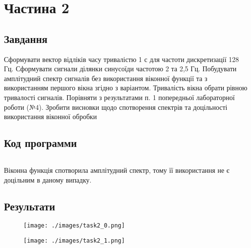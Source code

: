 \section{Частина 2}
\label{sec:task2}

\subsection{Завдання}
\label{subsec:task2_task}

Сформувати вектор відліків часу тривалістю 1 с для частоти
дискретизації 128 Гц. Сформувати сигнали ділянки синусоїди частотою 2 та
2,5 Гц. Побудувати амплітудний спектр сигналів без використання віконної
функції та з використанням першого вікна згідно з варіантом. Тривалість вікна
обрати рівною тривалості сигналів. Порівняти з результатами п. 1 попередньої
лабораторної роботи (№4). Зробити висновки щодо спотворення спектрів та
доцільності використання віконної обробки

\subsection{Код программи}
\label{subsec:task2_code}
\inputminted{python}{../src/task2.py}

Віконна функція спотворила амплітудний спектр,
тому її використання не є доцільним в даному випадку.

\subsection{Результати}
\label{subsec:task2_results}

\begin{figure}[!ht]
    \centering
    \texttt{[image: ./images/task2\_0.png]}
\end{figure}

\begin{figure}[!ht]
    \centering
    \texttt{[image: ./images/task2\_1.png]}
\end{figure}
